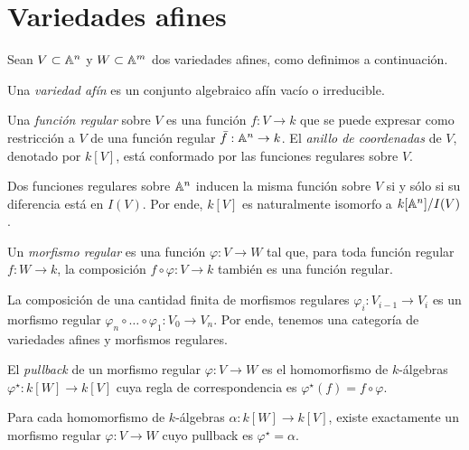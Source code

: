 \section{Variedades afines}

\begin{preliminaries}
Sean $V \subset \mathbb A^n$ y $W \subset \mathbb A^m$ dos variedades afines, como definimos a continuación.
\end{preliminaries}

\begin{definition}
Una \textit{variedad afín} es un conjunto algebraico afín vacío o irreducible.
\end{definition}

\begin{definition}
Una \textit{función regular} sobre $V$ es una función $f : V \to k$ que se puede expresar como restricción a $V$ de una función regular $\bar f : \mathbb A^n \to k$. El \textit{anillo de coordenadas} de $V$, denotado por $k[V]$, está conformado por las funciones regulares sobre $V$.
\end{definition}

\begin{remark}
Dos funciones regulares sobre $\mathbb A^n$ inducen la misma función sobre $V$ si y sólo si su diferencia está en $I(V)$. Por ende, $k[V]$ es naturalmente isomorfo a $k[\mathbb A^n] / I(V)$.
\end{remark}

\begin{definition}
Un \textit{morfismo regular} es una función $\varphi : V \to W$ tal que, para toda función regular $f : W \to k$, la composición $f \circ \varphi : V \to k$ también es una función regular.
\end{definition}

\begin{remark}
La composición de una cantidad finita de morfismos regulares $\varphi_i : V_{i-1} \to V_i$ es un morfismo regular $\varphi_n \circ \dots \circ \varphi_1 : V_0 \to V_n$. Por ende, tenemos una categoría de variedades afines y morfismos regulares.
\end{remark}

\begin{definition}
El \textit{pullback} de un morfismo regular $\varphi : V \to W$ es el homomorfismo de $k$-álgebras $\varphi^\star : k[W] \to k[V]$ cuya regla de correspondencia es $\varphi^\star(f) = f \circ \varphi$.
\end{definition}

\begin{proposition}
Para cada homomorfismo de $k$-álgebras $\alpha : k[W] \to k[V]$, existe exactamente un morfismo regular $\varphi : V \to W$ cuyo pullback es $\varphi^\star = \alpha$.
\end{proposition}

